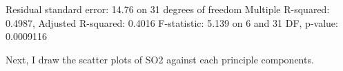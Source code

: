 \documentclass[
]{article}
\newenvironment{Shaded}{\begin{snugshade}}{\end{snugshade}}
\newcommand{\AttributeTok}[1]{\textcolor[rgb]{0.77,0.63,0.00}{#1}}
\newcommand{\CommentTok}[1]{\textcolor[rgb]{0.56,0.35,0.01}{\textit{#1}}}
\newcommand{\ControlFlowTok}[1]{\textcolor[rgb]{0.13,0.29,0.53}{\textbf{#1}}}
\newcommand{\DecValTok}[1]{\textcolor[rgb]{0.00,0.00,0.81}{#1}}
\newcommand{\ErrorTok}[1]{\textcolor[rgb]{0.64,0.00,0.00}{\textbf{#1}}}
\newcommand{\FloatTok}[1]{\textcolor[rgb]{0.00,0.00,0.81}{#1}}
\newcommand{\FunctionTok}[1]{\textcolor[rgb]{0.00,0.00,0.00}{#1}}
\newcommand{\NormalTok}[1]{#1}
\newcommand{\OtherTok}[1]{\textcolor[rgb]{0.56,0.35,0.01}{#1}}
\newcommand{\SpecialCharTok}[1]{\textcolor[rgb]{0.00,0.00,0.00}{#1}}
\newcommand{\StringTok}[1]{\textcolor[rgb]{0.31,0.60,0.02}{#1}}
\begin{document}
\begin{Shaded}
\begin{Highlighting}[]
\NormalTok{Residual standard error}\SpecialCharTok{:} \FloatTok{14.76}\NormalTok{ on }\DecValTok{31}\NormalTok{ degrees of freedom}
\NormalTok{Multiple R}\SpecialCharTok{{-}}\NormalTok{squared}\SpecialCharTok{:}  \FloatTok{0.4987}\NormalTok{,    Adjusted R}\SpecialCharTok{{-}}\NormalTok{squared}\SpecialCharTok{:}  \FloatTok{0.4016} 
\NormalTok{F}\SpecialCharTok{{-}}\NormalTok{statistic}\SpecialCharTok{:} \FloatTok{5.139}\NormalTok{ on }\DecValTok{6}\NormalTok{ and }\DecValTok{31}\NormalTok{ DF,  p}\SpecialCharTok{{-}}\NormalTok{value}\SpecialCharTok{:} \FloatTok{0.0009116}
\end{Highlighting}
\end{Shaded}

Next, I draw the scatter plots of SO2 against each principle components.

\begin{Shaded}
\end{Shaded}
\end{document}

